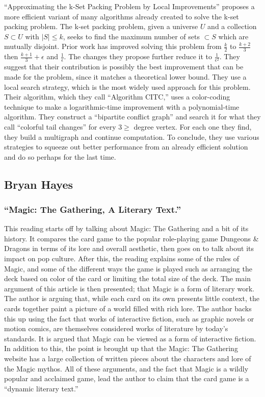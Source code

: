 \documentclass[12pt, letterpaper]{article}
\begin{document}
\enquote{Approximating the k-Set Packing Problem by Local Improvements}
proposes a more efficient variant of many algorithms already created to solve the k-set packing problem.
The k-set packing problem, given a universe $ U $ and a collection $ S \subset U $ with $ |S| \le k $,
seeks to find the maximum number of sets $ \subset S $ which are mutually disjoint.
Prior work has improved solving this problem from $ \frac{k}{2} $ to $ \frac{k + 2}{3} $
then $ \frac{k + 1}{3} + \epsilon $ and $ \frac{1}{\epsilon} $.
The changes they propose further reduce it to $ \frac{1}{\epsilon^2} $.
They suggest that their contribution is possibly the best improvement that can be made for the problem,
since it matches a theoretical lower bound.
They use a local search strategy,
which is the most widely used approach for this problem.
Their algorithm, which they call \enquote{Algorithm CITC,}
uses a color-coding technique to make a logarithmic-time improvement with a polynomial-time algorithm.
They construct a \enquote{bipartite conflict graph}
and search it for what they call \enquote{colorful tail changes} for every $ 3 \ge $ degree vertex.
For each one they find,
they build a multigraph and continue computation.
To conclude, they use various strategies to squeeze out better performance from an already efficient solution
and do so perhaps for the last time.

\subsection{Bryan Hayes}

\subsubsection{\enquote{Magic: The Gathering, A Literary Text.}}

This reading starts off by talking about Magic: The Gathering and a bit of its history.
It compares the card game to the popular role-playing game
Dungeons \& Dragons in terms of its lore and overall aesthetic,
then goes on to talk about its impact on pop culture.
After this, the reading explains some of the rules of Magic,
and some of the different ways the game is played such as arranging the deck based on color of the card or
limiting the total size of the deck.
The main argument of this article is then presented;
that Magic is a form of literary work.
The author is arguing that,
while each card on its own presents little context,
the cards together paint a picture of a world filled with rich lore.
The author backs this up using the fact that works of interactive fiction,
such as graphic novels or motion comics,
are themselves considered works of literature by today’s standards.
It is argued that Magic can be viewed as a form of interactive fiction.
In addition to this, the point is brought up that the Magic: The Gathering website
has a large collection of written pieces about the characters and lore of the Magic mythos.
All of these arguments, and the fact that Magic is a wildly popular and acclaimed game,
lead the author to claim that the card game is a \enquote{dynamic literary text.}
\end{document}
